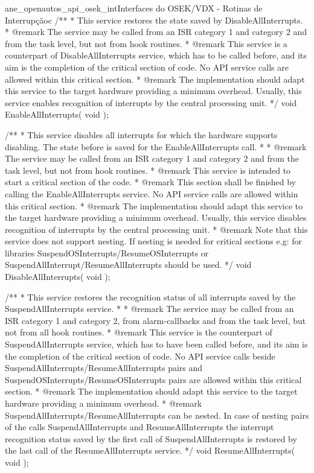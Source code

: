 \begin{algoritmo}{ane_openautos_api_osek_int}{Interfaces do OSEK/VDX - Rotinas de Interrupção}{c}
/**
* This service restores the state saved by DisableAllInterrupts.
* @remark The service may be called from an ISR category 1 and category 2 and from the task level, but not from hook routines.
* @remark This service is a counterpart of DisableAllInterrupts service, which has to be called before, and its aim is the completion of the critical section of code. No API service calls are allowed within this critical section.
* @remark The implementation should adapt this service to the target hardware providing a minimum overhead. Usually, this service enables recognition of interrupts by the central processing unit.
*/
void EnableAllInterrupts( void );

/**
* This service disables all interrupts for which the hardware supports disabling. The state before is saved for the EnableAllInterrupts call.
* 
* @remark The service may be called from an ISR category 1 and category 2 and from the task level, but not from hook routines.
* @remark This service is intended to start a critical section of the code. 
* @remark This section shall be finished by calling the EnableAllInterrupts service. No API service calls are allowed within this critical section.
* @remark The implementation should adapt this service to the target hardware providing a minimum overhead. Usually, this service disables recognition of interrupts by the central processing unit.
* @remark Note that this service does not support nesting. If nesting is needed for critical sections e.g: for libraries SuspendOSInterrupts/ResumeOSInterrupts or SuspendAllInterrupt/ResumeAllInterrupts should be used.
*/
void DisableAllInterrupts( void );


/**
* This service restores the recognition status of all interrupts saved by the SuspendAllInterrupts service.
* 
* @remark The service may be called from an ISR category 1 and category 2, from alarm-callbacks and from the task level, but not from all hook routines.
* @remark This service is the counterpart of SuspendAllInterrupts service, which has to have been called before, and its aim is the completion of the critical section of code. No API service calls beside SuspendAllInterrupts/ResumeAllInterrupts pairs and SuspendOSInterrupts/ResumeOSInterrupts pairs are allowed within this critical section.
* @remark The implementation should adapt this service to the target hardware providing a minimum overhead. 
* @remark SuspendAllInterrupts/ResumeAllInterrupts can be nested. In case of nesting pairs of the calls SuspendAllInterrupts and ResumeAllInterrupts the interrupt recognition status saved by the first call of SuspendAllInterrupts is restored by the last call of the ResumeAllInterrupts service.
*/
void ResumeAllInterrupts( void );


\end{algoritmo}

